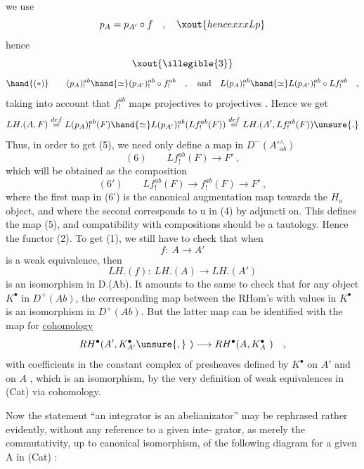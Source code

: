 
we use
\[ p_A = p_{A'} \circ f \quad , \quad \xout{hencexxxLp} \]
hence
\[ \xout{\illegible{3}} \]
\[ \hand{(*)} \qquad (p_A)_!^{ab} \hand{\simeq} (p_{A'})_!^{ab} \circ f_!^{ab} \quad , \quad \text{and} \quad L(p_A)_!^{ab} \hand{\simeq} L(p_{A'})_!^{ab} \circ Lf_!^{ab} \quad , \]
taking into account that $f_!^{ab}$ maps projectives to projectives . Hence
we get
\[ LH.(A,F) \overset{def}{=} L(p_A)_!^{ab}(F) \hand{\simeq} L(p_{A'})_!^{ab}(Lf_!^{ab}(F)) \overset{def}{=} LH.(A',Lf_!^{ab}(F)) \unsure{.} \]
Thus, in order to get (5), we need only define a map in $D^-(A'{}^{\wedge}_{ab})$
\[ (6) \qquad Lf_!^{ab}(F) \longrightarrow F' \ , \]
which will be obtained as the composition
\[ (6') \qquad Lf_!^{ab}(F) \longrightarrow f_!^{ab}(F) \longrightarrow F' \ , \]
where the first map in (6') is the canonical augmentation map towards
the $H_o$ object, and where the second corresponds to u in (4) by adjuncti%
on. This defines the map (5), and compatibility with compositions
should be a tautology. Hence the functor (2). To get (1), we still
have to check that when
\[ f: \ A \longrightarrow A' \]
is a weak equivalence, then
\[ LH.(f): \ LH.(A) \longrightarrow LH.(A') \]
is an isomorphism in D.(Ab). It amounts to the same to check that for
any object $K^\bullet$ in $D^+(Ab)$, the corresponding map between the RHom's
with values in $K^\bullet$ is  an isomorphism in $D^+(Ab)$. But 
the latter map can be identified with the map for \uline{cohomology}
\[ RH^\bullet(A',K^\bullet_{A'} \unsure{,} \ ) \longrightarrow RH^\bullet(A, K^\bullet_A \ ) \quad , \]
with coefficients in the constant complex of presheaves defined by $K^\bullet$
on $A'$ and on $A$ , which is an isomorphism, by the very definition
of weak equivalences in (Cat) via cohomology.

Now the statement ``an integrator  is an abelianizator'' may
be rephrased rather evidently, without any reference to a given inte-%
grator, as  merely the commutativity, up to canonical isomorphism,
of the  following diagram for a given A in (Cat) :

